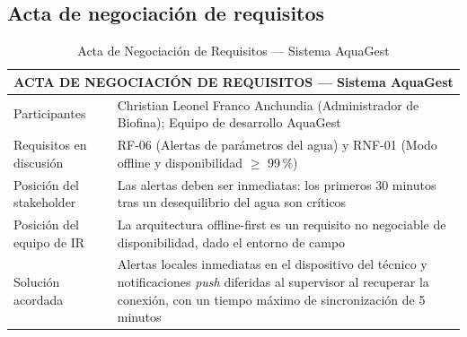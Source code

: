 \documentclass[12pt,a4paper]{article}
\begin{document}
\subsection{Acta de negociación de requisitos}

\begin{table}[H]
\centering
\caption{Acta de Negociación de Requisitos --- Sistema AquaGest}
\begin{tabular}{|p{4.0cm}|p{9.2cm}|}
\hline
\multicolumn{2}{|c|}{\textbf{ACTA DE NEGOCIACIÓN DE REQUISITOS --- Sistema AquaGest}} \\ \hline
Participantes & Christian Leonel Franco Anchundia (Administrador de Biofina);
Equipo de desarrollo AquaGest \\ \hline
Requisitos en discusión & RF-06 (Alertas de parámetros del agua) y RNF-01
(Modo offline y disponibilidad $\geq$ 99\,\%) \\ \hline
Posición del stakeholder & Las alertas deben ser inmediatas: los primeros
30 minutos tras un desequilibrio del agua son críticos \\ \hline
Posición del equipo de IR & La arquitectura offline-first es un requisito no
negociable de disponibilidad, dado el entorno de campo \\ \hline
Solución acordada & Alertas locales inmediatas en el dispositivo del técnico y
notificaciones \textit{push} diferidas al supervisor al recuperar la conexión,
con un tiempo máximo de sincronización de 5 minutos \\ \hline
\end{tabular}
\end{table}



\end{document}
